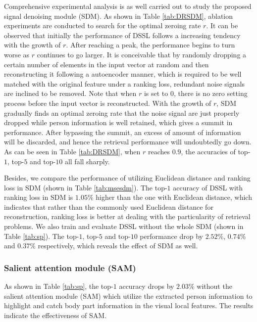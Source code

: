 \documentclass[sigconf]{acmart}
\begin{document}
Comprehensive experimental analysis is as well carried out to study the proposed signal denoising module (SDM). As shown in Table \ref{tab:DRSDM}, ablation experiments are conducted to search for the optimal zeroing rate $r$. It can be observed that initially the performance of DSSL follows a increasing tendency with the growth of $r$. After reaching a peak, the performance begins to turn worse as $r$ continues to go larger. It is conceivable that by randomly dropping a certain number of elements in the input vector at random and then reconstructing it following a autoencoder manner, which is required to be well matched with the original feature under a ranking loss, redundant noise signals are inclined to be removed. Note that when $r$ is set to $0$, there is no zero setting process before the input vector is reconstructed. With the growth of $r$, SDM gradually finds an optimal zeroing rate that the noise signal are just properly dropped while person information is well retained, which gives a summit in performance. After bypassing the summit, an excess of amount of information will be discarded, and hence the retrieval performance will undoubtedly go down. As can be seen in Table \ref{tab:DRSDM}, when $r$ reaches $0.9$, the accuracies of top-$1$, top-$5$ and top-$10$ all fall sharply.

Besides, we compare the performance of utilizing Euclidean distance and ranking loss in SDM (shown in Table \ref{tab:msesdm}). The top-$1$ accuracy of DSSL with ranking loss in SDM is $1.05\%$ higher than the one with Euclidean distance, which indicates that rather than the commonly used Euclidean distance for reconstruction, ranking loss is better at dealing with the particularity of retrieval problems. We also train and evaluate DSSL without the whole SDM (shown in Table \ref{tab:sp}). The top-$1$, top-$5$ and top-$10$ performance drop by $2.52\%$, $0.74\%$ and $0.37\%$ respectively, which reveals the effect of SDM as well.

\subsubsection{Salient attention module (SAM)}
As shown in Table \ref{tab:sp}, the top-$1$ accuracy drops by $2.03\%$ without the salient attention module (SAM) which utilize the extracted person information to highlight and catch body part information in the visual local features. The results indicate the effectiveness of SAM.
\end{document}
